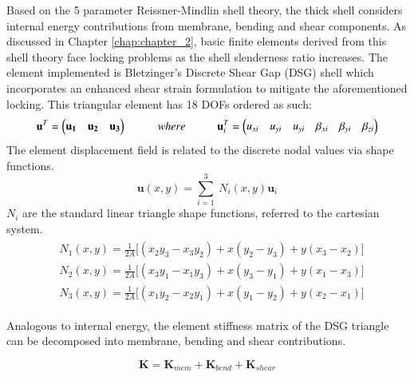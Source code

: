 Based on the 5 parameter Reissner-Mindlin shell theory, the thick shell considers internal energy contributions from membrane, bending and shear components. As discussed in Chapter \ref{chap:chapter_2}, basic finite elements derived from this shell theory face locking problems as the shell slenderness ratio increases. The element implemented is Bletzinger's Discrete Shear Gap (DSG) shell \cite{Ble00} which incorporates an enhanced shear strain formulation to mitigate the aforementioned locking. This triangular element has 18 DOFs ordered as such:
\begin{equation} 
\mathbf{u}^T = 
\begin{pmatrix}
\mathbf{u_1} & \mathbf{u_2} & \mathbf{u_3}
\end{pmatrix} 
\hspace{10mm}
where
\hspace{10mm}
\mathbf{u}_i^T = 
\begin{pmatrix}
{u_{xi}} & {u_{yi}} & {u_{yi}} & {\beta_{xi}} & {\beta_{yi}} & {\beta_{zi}}
\end{pmatrix}
\label{eqt1}
\end{equation}
The element displacement field is related to the discrete nodal values via shape functions.
\begin{equation} 
\mathbf{u}(x, y) = \sum_{i=1}^3 \ N_i(x,y) \mathbf{u}_i
\label{eqt2}
\end{equation}
$N_i$ are the standard linear triangle shape functions, referred to the cartesian system.
\begin{gather} 
	\begin{aligned}
		&N_1 (x , y) = \frac{1}{2 A} \big[ (x_2 y_3 - x_3 y_2) + x(y_2 - y_3) + y(x_3 - x_2) \big]
		\\
		&N_2 (x , y) = \frac{1}{2 A} \big[ (x_3 y_1 - x_1 y_3) + x(y_3 - y_1) + y(x_1 - x_3) \big]
		\\
		&N_3 (x , y) = \frac{1}{2 A} \big[ (x_1 y_2 - x_2 y_1) + x(y_1 - y_2) + y(x_2 - x_1) \big]
		\label{eqt3}
	\end{aligned}
\end{gather}

Analogous to internal energy, the element stiffness matrix of the DSG triangle can be decomposed into membrane, bending and shear contributions.

\begin{equation} 
\mathbf{K} = \mathbf{K}_{mem} + \mathbf{K}_{bend} + \mathbf{K}_{shear}
\label{eqt4}
\end{equation}

